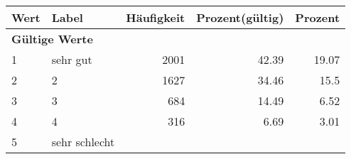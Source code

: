      \begin{longtable}{lXrrr}
     \toprule
     \textbf{Wert} & \textbf{Label} & \textbf{Häufigkeit} & \textbf{Prozent(gültig)} & \textbf{Prozent} \\
     \endhead
     \midrule
     \multicolumn{5}{l}{\textbf{Gültige Werte}}\\

     1 &
     \multicolumn{1}{X}{ sehr gut   } &


       \num{2001} &
       \num[round-mode=places,round-precision=2]{42,39} &
         \num[round-mode=places,round-precision=2]{19,07} \\

     2 &
     \multicolumn{1}{X}{ 2   } &


       \num{1627} &
       \num[round-mode=places,round-precision=2]{34,46} &
         \num[round-mode=places,round-precision=2]{15,5} \\

     3 &
     \multicolumn{1}{X}{ 3   } &


       \num{684} &
       \num[round-mode=places,round-precision=2]{14,49} &
         \num[round-mode=places,round-precision=2]{6,52} \\

     4 &
     \multicolumn{1}{X}{ 4   } &


       \num{316} &
       \num[round-mode=places,round-precision=2]{6,69} &
         \num[round-mode=places,round-precision=2]{3,01} \\

     5 &
     \multicolumn{1}{X}{ sehr schlecht   } &



\end{longtable}
